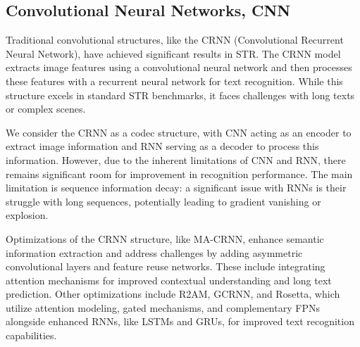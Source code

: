 \documentclass[runningheads]{llncs}
\begin{document}
\subsection{Convolutional Neural Networks, CNN}
Traditional convolutional structures, like the CRNN (Convolutional Recurrent Neural Network), have achieved significant results in STR.	The CRNN model extracts image features using a convolutional neural network and then processes these features with a recurrent neural network for text recognition.	While this structure excels in standard STR benchmarks, it faces challenges with long texts or complex scenes.

We consider the CRNN as a codec structure, with CNN acting as an encoder to extract image information and RNN serving as a decoder to process this information.	However, due to the inherent limitations of CNN and RNN, there remains significant room for improvement in recognition performance.	The main limitation is sequence information decay: a significant issue with RNNs is their struggle with long sequences, potentially leading to gradient vanishing or explosion.	

Optimizations of the CRNN structure, like MA-CRNN\cite{tong2020ma_MACRNN}, enhance semantic information extraction and address challenges by adding asymmetric convolutional layers and feature reuse networks. These include integrating attention mechanisms for improved contextual understanding and long text prediction.	Other optimizations include R2AM\cite{lee2016recursive_R2AM}, GCRNN\cite{elbasani2021gcrnn}, and Rosetta\cite{borisyuk2018rosetta}, which utilize attention modeling, gated mechanisms, and complementary FPNs alongside enhanced RNNs, like LSTMs and GRUs, for improved text recognition capabilities.	
\end{document}
